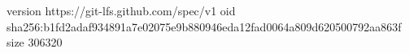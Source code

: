 version https://git-lfs.github.com/spec/v1
oid sha256:b1fd2adaf934891a7e02075e9b880946eda12fad0064a809d620500792aa863f
size 306320
